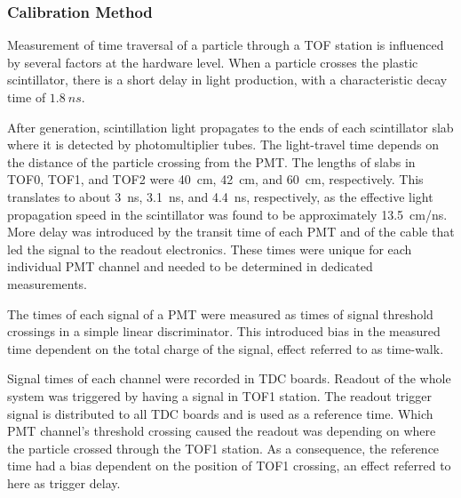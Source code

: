 \subsubsection{Calibration Method}

Measurement of time traversal of a particle through a TOF station is
influenced by several factors at the hardware level. When a particle
crosses the plastic scintillator, there is a short delay in light
production, with a characteristic decay time of $1.8~ns$.

After generation, scintillation light propagates to the ends of each
scintillator slab where it is detected by photomultiplier tubes. The
light-travel time depends on the distance of the particle crossing
from the PMT. The lengths of slabs in TOF0, TOF1, and TOF2 were 40~cm,
42~cm, and 60~cm, respectively. This translates to about 3~ns, 3.1~ns,
and 4.4~ns, respectively, as the effective light propagation speed in
the scintillator was found to be approximately 13.5~cm/ns.
More delay was introduced by the transit time of each PMT and of the
cable that led the signal to the readout electronics. These times were
unique for each individual PMT channel and needed to be determined in
dedicated measurements.

The times of each signal of a PMT were measured as times of signal threshold
crossings in a simple linear discriminator. This introduced bias in
the measured time dependent on the total charge of the signal, effect
referred to as time-walk.

Signal times of each channel were recorded in TDC boards. Readout of
the whole system was triggered by having a signal in TOF1 station. The
readout trigger signal is distributed to all TDC boards and is used as
a reference time. Which PMT channel's threshold crossing caused the
readout was depending on where the particle crossed through the TOF1
station. As a consequence, the reference time had a bias dependent on
the position of TOF1 crossing, an effect referred to here as trigger
delay.

